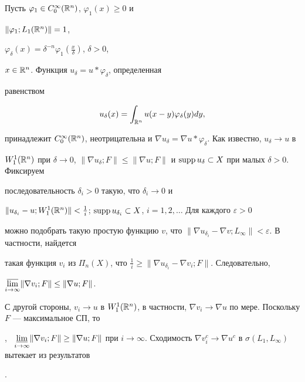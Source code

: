 \begin{pf} 


Пусть $\varphi_1\in C^\infty_0(\Bbb R^n)$, $\varphi_1(x)\ge0$ и 


$\|\varphi_1;L_1(\Bbb R^n)\|=1$, 


$\varphi_\delta(x)=\delta^{-n}\varphi_1(\frac{x}{\delta})$, $\delta>0$, 


$x\in\Bbb R^n$. Функция $u_\delta=u\ast\varphi_\delta$, определенная 


равенством 


$$ 


u_\delta(x)=\int_{\Bbb R^n}u(x-y)\varphi_\delta(y)d y, 


$$ 


принадлежит $C^\infty_0(\Bbb R^n)$, неотрицательна и $\nabla 


u_\delta=\nabla u\ast\varphi_\delta$. Как известно, $u_\delta\to u$ в 


$W^1_1(\Bbb R^n)$ при $\delta\to0$, $\|\nabla u_\delta;F\|\le\|\nabla 


u;F\|$ и $\supp u_\delta\subset X$ при малых $\delta>0$. Фиксируем 


последовательность $\delta_i>0$ такую, что $\delta_i\to0$ и 


$\|u_{\delta_i}-u;W^1_1(\Bbb R^n)\|<\frac{1}{i}$; $\supp 


u_{\delta_i}\subset X$, $i=1,2,\dotsc$ Для каждого $\varepsilon>0$ 


можно подобрать такую простую функцию $v$, что $\|\nabla 


u_{\delta_i}-\nabla v;L_\infty\|<\varepsilon$. В частности, найдется 


такая функция $v_i$ из $\Pi_n(X)$, что $\frac{1}{i}\ge\|\nabla 


u_{\delta_i}-\nabla v_i;F\|$. Следовательно, 


$\underset{i\to\infty}{\varlimsup}{}\|\nabla v_i;F\|\le\|\nabla u;F\|$. 


С другой стороны, $v_i\to u$ в $W^1_1(\Bbb R^n)$, в частности, $\nabla 


v_i\to\nabla u$ по мере. Поскольку $F$ --- максимальное СП, то 


\cite{7}, \cite{10} \ $\underset{i\to\infty}{\varliminf}{}\|\nabla 


v_i;F\|\ge\|\nabla u;F\|$ при $i\to\infty$. Сходимость $\nabla 


v^c_i\to\nabla u^c$ в $\sigma(L_1,L_\infty)$ вытекает из результатов 


\cite{8}. 


\end{pf} 


